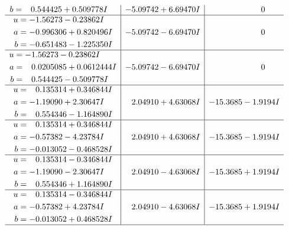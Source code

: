 \documentclass[1p]{elsarticle_modified}
\theoremstyle{definition}
\begin{document}
$$\begin{array}{c|c|c}
\begin{aligned}
b &= \phantom{-}0.544425 + 0.509778 I\end{aligned}
 & -5.09742 + 6.69470 I & \phantom{-0.000000 } 0 \\ \hline\begin{aligned}
u &= -1.56273 - 0.23862 I \\
a &= -0.996306 + 0.820496 I \\
b &= -0.651483 - 1.225350 I\end{aligned}
 & -5.09742 - 6.69470 I & \phantom{-0.000000 } 0 \\ \hline\begin{aligned}
u &= -1.56273 - 0.23862 I \\
a &= \phantom{-}0.0205085 + 0.0612444 I \\
b &= \phantom{-}0.544425 - 0.509778 I\end{aligned}
 & -5.09742 - 6.69470 I & \phantom{-0.000000 } 0 \\ \hline\begin{aligned}
u &= \phantom{-}0.135314 + 0.346844 I \\
a &= -1.19090 + 2.30647 I \\
b &= \phantom{-}0.554346 - 1.164890 I\end{aligned}
 & \phantom{-}2.04910 + 4.63068 I & -15.3685 - 1.9194 I \\ \hline\begin{aligned}
u &= \phantom{-}0.135314 + 0.346844 I \\
a &= -0.57382 - 4.23784 I \\
b &= -0.013052 - 0.468528 I\end{aligned}
 & \phantom{-}2.04910 + 4.63068 I & -15.3685 - 1.9194 I \\ \hline\begin{aligned}
u &= \phantom{-}0.135314 - 0.346844 I \\
a &= -1.19090 - 2.30647 I \\
b &= \phantom{-}0.554346 + 1.164890 I\end{aligned}
 & \phantom{-}2.04910 - 4.63068 I & -15.3685 + 1.9194 I \\ \hline\begin{aligned}
u &= \phantom{-}0.135314 - 0.346844 I \\
a &= -0.57382 + 4.23784 I \\
b &= -0.013052 + 0.468528 I\end{aligned}
 & \phantom{-}2.04910 - 4.63068 I & -15.3685 + 1.9194 I\\
 \hline 
 \end{array}$$\newpage$$\begin{array}{c|c|c}  

\end{array}$$
\end{document}
